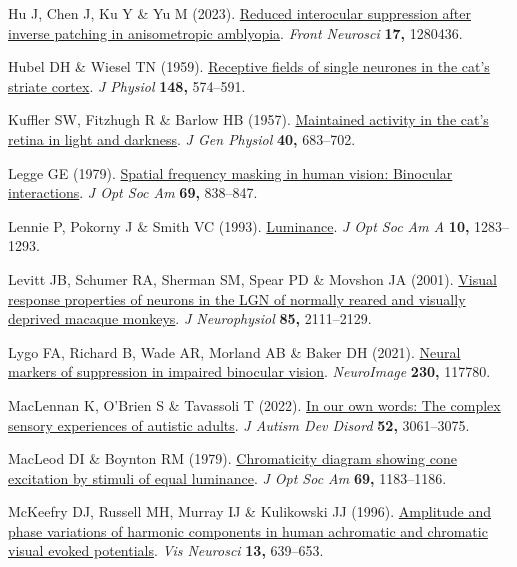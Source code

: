\documentclass[
  letterpaper,
  DIV=11,
  numbers=noendperiod]{scrartcl}
\newlength{\cslhangindent}
\newenvironment{CSLReferences}[2] %
 {\begin{list}{}{%
  \setlength{\itemindent}{0pt}
  \setlength{\leftmargin}{0pt}
  \setlength{\parsep}{0pt}
  \ifodd #1
   \setlength{\leftmargin}{\cslhangindent}
   \setlength{\itemindent}{-1\cslhangindent}
  \fi
  \setlength{\itemsep}{#2\baselineskip}}}
 {\end{list}}
\begin{document}
\begin{CSLReferences}{1}{1}
Hu J, Chen J, Ku Y \& Yu M (2023).
\href{https://doi.org/10.3389/fnins.2023.1280436}{Reduced interocular
suppression after inverse patching in anisometropic amblyopia}.
\emph{Front Neurosci} \textbf{17,} 1280436.

Hubel DH \& Wiesel TN (1959).
\href{https://doi.org/10.1113/jphysiol.1959.sp006308}{Receptive fields
of single neurones in the cat's striate cortex}. \emph{J Physiol}
\textbf{148,} 574--591.

Kuffler SW, Fitzhugh R \& Barlow HB (1957).
\href{https://doi.org/10.1085/jgp.40.5.683}{Maintained activity in the
cat's retina in light and darkness}. \emph{J Gen Physiol} \textbf{40,}
683--702.

Legge GE (1979). \href{https://doi.org/10.1364/josa.69.000838}{Spatial
frequency masking in human vision: Binocular interactions}. \emph{J Opt
Soc Am} \textbf{69,} 838--847.

Lennie P, Pokorny J \& Smith VC (1993).
\href{https://doi.org/10.1364/josaa.10.001283}{Luminance}. \emph{J Opt
Soc Am A} \textbf{10,} 1283--1293.

Levitt JB, Schumer RA, Sherman SM, Spear PD \& Movshon JA (2001).
\href{https://doi.org/10.1152/jn.2001.85.5.2111}{Visual response
properties of neurons in the LGN of normally reared and visually
deprived macaque monkeys}. \emph{J Neurophysiol} \textbf{85,}
2111--2129.

Lygo FA, Richard B, Wade AR, Morland AB \& Baker DH (2021).
\href{https://doi.org/10.1016/j.neuroimage.2021.117780}{Neural markers
of suppression in impaired binocular vision}. \emph{NeuroImage}
\textbf{230,} 117780.

MacLennan K, O'Brien S \& Tavassoli T (2022).
\href{https://doi.org/10.1007/s10803-021-05186-3}{In our own words: The
complex sensory experiences of autistic adults}. \emph{J Autism Dev
Disord} \textbf{52,} 3061--3075.

MacLeod DI \& Boynton RM (1979).
\href{https://doi.org/10.1364/josa.69.001183}{Chromaticity diagram
showing cone excitation by stimuli of equal luminance}. \emph{J Opt Soc
Am} \textbf{69,} 1183--1186.

McKeefry DJ, Russell MH, Murray IJ \& Kulikowski JJ (1996).
\href{https://doi.org/10.1017/s0952523800008543}{Amplitude and phase
variations of harmonic components in human achromatic and chromatic
visual evoked potentials}. \emph{Vis Neurosci} \textbf{13,} 639--653.


\end{CSLReferences}
\end{document}
